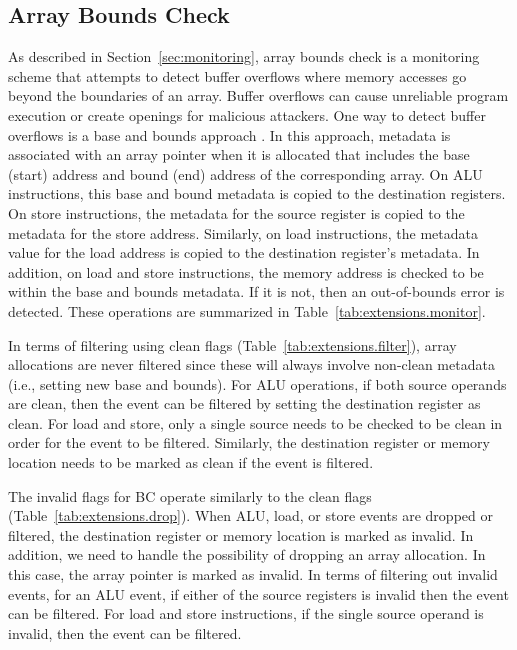 \subsection{Array Bounds Check}

As described in Section~\ref{sec:monitoring}, array bounds check is a
monitoring scheme that attempts to detect buffer overflows where memory
accesses go beyond the boundaries of an array.
Buffer overflows can cause unreliable program execution or create openings for
malicious attackers. One way to detect buffer overflows is a base and bounds
approach \cite{hardbound-asplos08}. In this approach, metadata is
associated with an array pointer when it is allocated that includes the base
(start) address and bound (end) address of the corresponding array. On ALU
instructions, this base and bound metadata is copied to the destination
registers.  On store instructions, the metadata for the source register is
copied to the metadata for the store address. Similarly, on load instructions,
the metadata value for the load address is copied to the destination register's
metadata. In addition, on load and store instructions, the memory address is
checked to be within the base and bounds metadata. If it is not, then an
out-of-bounds error is detected. These operations are summarized in
Table~\ref{tab:extensions.monitor}.

In terms of filtering using clean flags (Table~\ref{tab:extensions.filter}),
array allocations are never filtered since these will always involve non-clean
metadata (i.e., setting new base and bounds). For ALU operations, if both
source operands are clean, then the event can be filtered by setting the
destination register as clean. For load and store, only a single source needs
to be checked to be clean in order for the event to be filtered. Similarly, the
destination register or memory location needs to be marked as clean if the
event is filtered.

The invalid flags for BC operate similarly to the clean flags
(Table~\ref{tab:extensions.drop}). When ALU, load, or store events are dropped or filtered,
the destination register or memory location is marked as invalid. In addition,
we need to handle the possibility of dropping an array allocation. In this
case, the array pointer is marked as invalid. In terms of filtering out invalid
events, for an ALU event, if either of the source registers is invalid then the
event can be filtered. For load and store instructions, if the single source
operand is invalid, then the event can be filtered.

